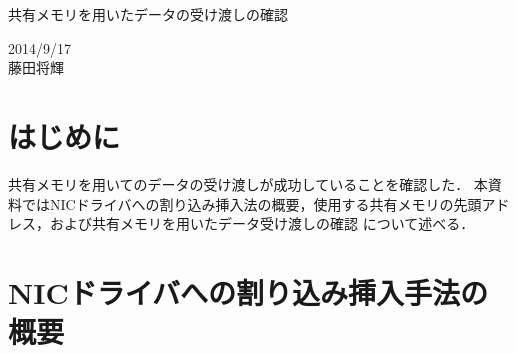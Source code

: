 \documentclass[12pt]{jsarticle}
\begin{document}

\begin{center}
{\LARGE 共有メモリを用いたデータの受け渡しの確認}
\end{center}

\begin{flushright}
  2014/9/17\\
  藤田将輝
\end{flushright}
\section{はじめに}

共有メモリを用いてのデータの受け渡しが成功していることを確認した．
本資料ではNICドライバへの割り込み挿入法の概要，使用する共有メモリの先頭アドレス，および共有メモリを用いたデータ受け渡しの確認
について述べる．


\section{NICドライバへの割り込み挿入手法の概要}
\end{document}
